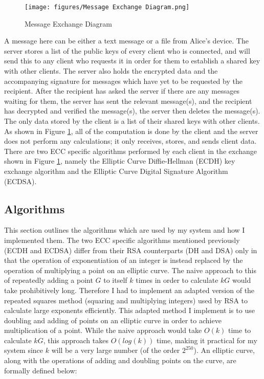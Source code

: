 \documentclass[12pt,a4paper]{article}
\begin{document}
\begin{figure}[htb]
    \centering
    \texttt{[image: figures/Message Exchange Diagram.png]}
    \caption{Message Exchange Diagram}
    \label{fig:messages}
\end{figure}

A message here can be either a text message or a file from Alice's device. 
The server stores a list of the public keys of every client who is connected, 
and will send this to any client who requests it in order for them to establish a shared key with other clients. 
The server also holds the encrypted data and the accompanying signature for messages which have yet to be requested by the recipient. 
After the recipient has asked the server if there are any messages waiting for them, the server has sent the relevant message(s), 
and the recipient has decrypted and verified the message(s), the server then deletes the message(s). 
The only data stored by the client is a list of their shared keys with other clients. 
As shown in Figure \ref{fig:messages}, all of the computation is done by the client and the server does not perform any calculations; 
it only receives, stores, and sends client data. 
There are two ECC specific algorithms performed by each client in the exchange shown in Figure \ref{fig:messages}, 
namely the Elliptic Curve Diffie-Hellman (ECDH) key exchange algorithm and the Elliptic Curve Digital Signature Algorithm (ECDSA). 

\subsection{Algorithms} \label{Algorithms}
This section outlines the algorithms which are used by my system and how I implemented them. 
The two ECC specific algorithms mentioned previously (ECDH and ECDSA) differ from their RSA counterparts (DH and DSA) only in that 
the operation of exponentiation of an integer is instead replaced by the operation of multiplying a point on an elliptic curve. 
The naive approach to this of repeatedly adding a point $G$ to itself $k$ times in order to calculate $kG$ would take prohibitively long. 
Therefore I had to implement an adapted version of the repeated squares method (squaring and multiplying integers) 
used by RSA to calculate large exponents efficiently. 
This adapted method I implement is to use doubling and adding of points on an elliptic curve in order to achieve multiplication of a point. 
While the naive approach would take $O(k)$ time to calculate $kG$, this approach takes $O(log(k))$ time, 
making it practical for my system since $k$ will be a very large number (of the order $2^{250}$). 
An elliptic curve, along with the operations of adding and doubling points on the curve, are formally defined below: 
\end{document}
